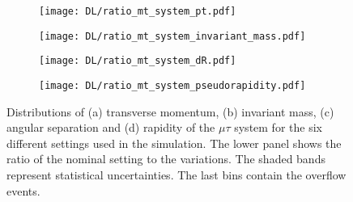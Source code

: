 \begin{figure}[H]
    \centering
    \begin{subfigure}{0.49\textwidth}
        \centering
        \texttt{[image: DL/ratio\_mt\_system\_pt.pdf]}
        \caption{}
        \label{app:subfig:pt(mt)_DL}
    \end{subfigure}
    \begin{subfigure}{0.49\textwidth}
        \centering
        \texttt{[image: DL/ratio\_mt\_system\_invariant\_mass.pdf]}
        \caption{}
        \label{app:subfig:m(mt)_DL}
    \end{subfigure}

    \vspace{0.2cm}
    
    \begin{subfigure}{0.49\textwidth}
        \centering
        \texttt{[image: DL/ratio\_mt\_system\_dR.pdf]}
        \caption{}
        \label{app:subfig:dR(mt)_DL}
    \end{subfigure}
    \begin{subfigure}{0.49\textwidth}
        \centering
        \texttt{[image: DL/ratio\_mt\_system\_pseudorapidity.pdf]}
        \caption{}
        \label{app:subfig:eta(mt)_DL}
    \end{subfigure}
    \caption{Distributions of (a) transverse momentum, (b) invariant mass,  (c) angular separation and (d) rapidity of the $\mu\tau$ system for the six different settings used in the simulation. The lower panel shows the ratio of the nominal setting to the variations. The shaded bands represent statistical uncertainties. The last bins contain the overflow events.}
    \label{app:fig:mutau_DL}
\end{figure}


